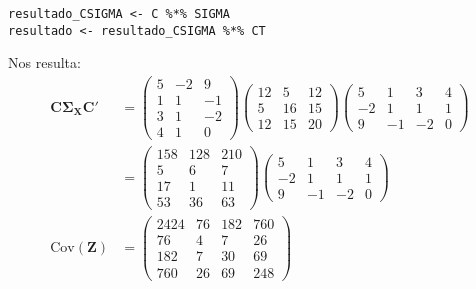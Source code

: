 \begin{sol}
\begin{verbatim}
resultado_CSIGMA <- C %*% SIGMA
resultado <- resultado_CSIGMA %*% CT
\end{verbatim}
Nos resulta:
\begin{align*}
\mathbf{C \Sigma_X C'} &= \begin{pmatrix}
5 &-2 &9 \\
1 & 1 &-1\\
3 & 1 &-2\\
4 & 1 & 0
\end{pmatrix}
\begin{pmatrix}
12&5&12\\
5&16&15\\
12&15&20
\end{pmatrix}
\begin{pmatrix}
5 & 1&3 &4\\
-2& 1&1&1\\
9 &-1 & -2 &0
\end{pmatrix}\\
&= 
\begin{pmatrix}
158 & 128 & 210 \\
5&6&7\\
17&1&11\\
53 & 36 & 63
\end{pmatrix} 
\begin{pmatrix}
5 & 1&3 &4\\
-2& 1&1&1\\
9 &-1 & -2 &0
\end{pmatrix}\\
\text{Cov}(\mathbf{Z})&= 
\begin{pmatrix}
2424 & 76 & 182 & 760 \\
76&4&7&26 \\
182 & 7 &30 &69\\
760 & 26 &69 &248
\end{pmatrix}
\end{align*}
\end{sol}
